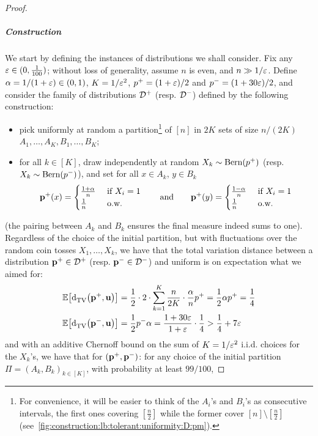 \begin{proof}
  \subparagraph{Construction} We start by defining the instances of distributions we shall consider. Fix any $\varepsilon\in(0,\frac{1}{100})$; without loss of generality, assume $n$ is even, and $n \gg 1/\varepsilon$. Define $\alpha = {{1}}/(1+\varepsilon)\in(0,1)$, $K= 1/\varepsilon^2$, $p^+ = (1+\varepsilon)/2$ and $p^- = (1+{{30}}\varepsilon)/2$, and consider the family of distributions $\mathcal{D}^+$ (resp. $\mathcal{D}^-$) defined by the following construction:
  \begin{itemize}
    \item pick uniformly at random a partition\footnote{For convenience, it will be easier to think of the $A_i$'s and $B_i$'s as consecutive intervals, the first ones covering $[\frac n 2]$ while the former cover $[n]\setminus[\frac n 2]$ (see~\cref{fig:construction:lb:tolerant:uniformity:D:pm}).} of $[n]$ in $2K$ sets of size $n/(2K)$ $A_1,\dots, A_K, B_1,\dots, B_K$;
    \item for all $k\in[K]$, draw independently at random $X_k\sim\operatorname{Bern}\!\left( p^+ \right)$ (resp. $X_k\sim\operatorname{Bern}\!\left( p^- \right)$), and set for all $x\in A_k$, $y\in B_k$
    \[
    \mathbf{p}^+(x)=\begin{cases}
      \frac{1+\alpha}{n} & \text{ if } X_i = 1 \\
      \frac{1}{n} & \text{ o.w.}
    \end{cases}
    \qquad\text{and}\qquad
    \mathbf{p}^+(y)=\begin{cases}
      \frac{1-\alpha}{n} & \text{ if } X_i = 1 \\
      \frac{1}{n} & \text{ o.w.}
    \end{cases}
    \]
  \end{itemize}
  (the pairing between $A_k$ and $B_k$ ensures the final measure indeed sums to one).
  Regardless of the choice of the initial partition, but with fluctuations over the random coin tosses $X_1,\dots, X_k$, we have that the total variation distance between a distribution $\mathbf{p}^+\in\mathcal{D}^+$ (resp. $\mathbf{p}^-\in\mathcal{D}^-$) and uniform is on expectation what we aimed for:
  \begin{align*}
  \mathbb{E}\!\left[ {\operatorname{d}_{\rm{TV}}^{}\!\left({\mathbf{p}^+, \mathbf{u}}\right)} \right] &= \frac{1}{2}\cdot 2\cdot\sum_{k=1}^K \frac{n}{2K}\cdot\frac{\alpha}{n}p^+ = \frac{1}{2}\alpha p^+ = \frac{1}{{{4}}} \\
  \mathbb{E}\!\left[ {\operatorname{d}_{\rm{TV}}^{}\!\left({\mathbf{p}^{-\vphantom{+}}, \mathbf{u}}\right)} \right] &= \frac{1}{2} p^-\alpha = \frac{1+{{30}}\varepsilon}{1+\varepsilon}\cdot\frac{1}{{{4}}} > \frac{1}{{{4}}} + 7\varepsilon
  \end{align*}
  and with an additive Chernoff bound on the sum of $K=1/\varepsilon^2$ i.i.d. choices for the $X_k$'s, we have that for $(\mathbf{p}^+, \mathbf{p}^-)$: for any choice of the initial partition $\Pi=(A_k,B_k)_{k\in[K]}$, with probability at least $99/100$,

\end{proof}
